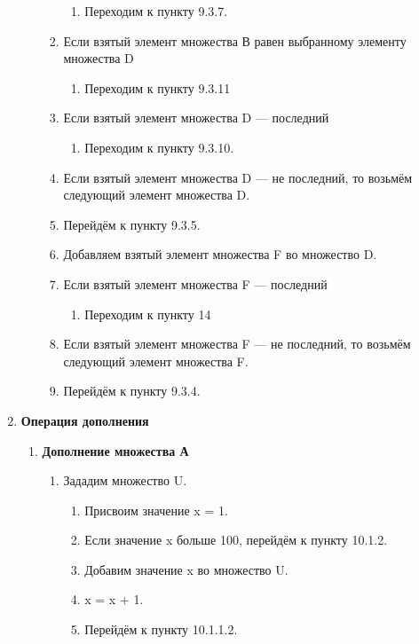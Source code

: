 \documentclass[a4paper,12pt]{extarticle}
\begin{document}
\begin{enumerate}
\begin{enumerate}[label*=\arabic*.]
\begin{enumerate}[label*=\arabic*.]
\begin{enumerate}[label*=\arabic*.]
        \item Переходим к пункту 9.3.7.
      \end{enumerate}
      \item Если взятый элемент множества В равен выбранному элементу множества D
      \begin{enumerate}[label*=\arabic*.]
        \item Переходим к пункту 9.3.11
      \end{enumerate}
      \item Если взятый элемент множества D — последний
      \begin{enumerate}[label*=\arabic*.]
        \item Переходим к пункту 9.3.10.
      \end{enumerate}
      \item Если взятый элемент множества D — не последний, то возьмём следующий элемент множества D.
      \item Перейдём к пункту 9.3.5.
      \item Добавляем взятый элемент множества F во множество D.
      \item Если взятый элемент множества F — последний
      \begin{enumerate}[label*=\arabic*.]
        \item Переходим к пункту 14
      \end{enumerate}
      \item Если взятый элемент множества F — не последний, то возьмём следующий элемент множества F.
      \item Перейдём к пункту 9.3.4.
    \end{enumerate}
  \end{enumerate}
  \item \textbf{Операция дополнения}
  \begin{enumerate}[label*=\arabic*.]
    \item \textbf{Дополнение множества А}
    \begin{enumerate}[label*=\arabic*.]
      \item Зададим множество U.
      \begin{enumerate}[label*=\arabic*.]
        \item Присвоим значение x = 1.
        \item Если значение x больше 100, перейдём к пункту 10.1.2.
        \item Добавим значение x во множество U.
        \item x = x + 1.
        \item Перейдём к пункту 10.1.1.2.

\end{enumerate}
\end{enumerate}
\end{enumerate}
\end{enumerate}
\end{document}
